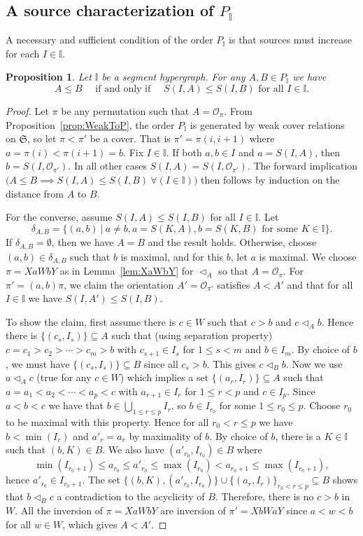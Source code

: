 \documentclass[reqno]{amsart}
\newtheorem{proposition}[theorem]{Proposition}
\theoremstyle{definition}
\newcommand{\fS}{\mathfrak{S}} %
\newcommand{\less}{\vartriangleleft} %
\newcommand{\Or}{\mathcal O}  %
\newcommand{\II}{\mathbb I} %
\begin{document}
\subsection{A source characterization of $P_\II$}  
\label{subsec:sourceinc}

A necessary and sufficient  condition of the order $P_\II$ is that sources must increase for each $I\in \II$.

\begin{proposition}
\label{prop:sourceorder}
Let $\II$ be a segment hypergraph. For any $A,B\in P_\II$ we have
$$ A\le B\quad  \text{ if and only if }\quad  S(I,A)\le S(I,B) \text{ for all } I\in \II .$$
\end{proposition}
\begin{proof} Let $\pi$ be any permutation such that $A=\Or_\pi$. From Proposition~\ref{prop:WeakToP}, the order $P_\II$ is generated by  weak cover relations on $\fS$,
so let $\pi<\pi'$ be a cover. That is $\pi'=\pi(i,i+1)$ where $a=\pi(i)<\pi(i+1)=b$. Fix $I\in \II$. If both $a,b\in I$ and $a=S(I,A)$, then $b=S(I, \Or_{\pi'})$.
In all other cases $S(I,A)=S(I,\Or_{\pi'})$. The forward implication $\big(A\le B \implies S(I,A)\le S(I,B)\  \forall( I\in \II)\big)$ then follows by induction on the distance from $A$ to $B$.

For the converse, assume $S(I,A)\le S(I,B)$  for all $ I\in \II$. Let 
	$$\delta_{A,B}=\big\{(a,b)\  |\  a\not= b, a=S(K,A), b=S(K,B)\text{ for some } K\in \II\big\}.$$
If $\delta_{A,B}=\emptyset$, then we have $A=B$ and the result holds. Otherwise, choose $(a,b)\in \delta_{A,B}$ such that $b$ is maximal, and for this $b$, let $a$ is maximal.
We choose $\pi=XaWbY$ as in Lemma~\ref{lem:XaWbY} for $\less_A$ so that $A=\Or_\pi$. For $\pi'=(a,b)\pi$, we claim the orientation $A'=\Or_{\pi'}$ satisfies $A<A'$ and  that for all $I\in \II$ we have $S(I,A')\le S(I,B)$.

To show the claim, first assume there is $c\in W$ such that $c>b$ and $c\less_A b$. Hence there is $\{(c_s,I_s)\}\subseteq A$ such that (using separation property) $c=c_1>c_2>\cdots>c_{m}>b$ 
with $c_{s+1}\in I_s$ for $1\le s<m$ and $b\in I_m$. By choice of $b$,  we must have $\{(c_s,I_s)\}\subseteq B$ since all $c_s>b$. This gives $c\less_B b$. 
Now we use $a\less_A c$ (true for any $c\in W$) which implies a set
$\{(a_r,I_r)\}\subseteq A$ such that $a=a_1<a_2<\cdots<a_{p}<c$ 
with $a_{r+1}\in I_r$ for $1\le r<p$ and $c\in I_{p}$. Since $a<b<c$ we have that $b\in \bigcup_{1\le r\le p} I_r$, so $b\in I_{r_0}$ for some $1\le r_0\le p$. 
Choose $r_0$ to be maximal with this property. Hence for all $r_0<r\le p$ we have  $b< \min(I_r)$ and $a'_r=a_r$ by maximality of $b$. By choice of $b$, 
there is a $K\in\II$ such that $(b,K)\in B$. We also have $(a'_{r_0},I_{r_0})\in B$ where 
 $$\min(I_{r_0+1})\le a_{r_0}\le a'_{r_0} \le \max(I_{r_0}) < a_{r_0+1} \le \max(I_{r_0+1}),$$
 hence $a'_{r_0} \in I_{r_0+1}$.
The set $\{(b,K),(a'_{r_0},I_{r_0})\} \cup \{(a_r,I_r)\}_{r_0<r\le p} \subseteq B$ shows that $b\less_B c$ a contradiction to the acyclicity of $B$. 
Therefore, there is no $c>b$ in $W$. All the inversion of $\pi=XaWbY$ are inversion of $\pi'=XbWaY$ since $a<w<b$ for all $w\in W$, which gives $A<A'$.


\end{proof}
\end{document}
